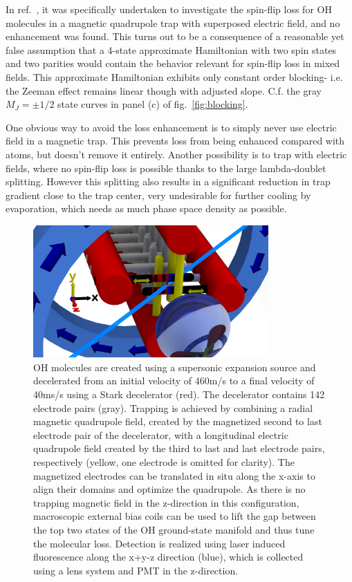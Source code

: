 \documentclass[%
 reprint,
 amsmath,amssymb,
 aps,
prl,
]{revtex4-1}
\begin{document}
In ref.~\cite{Lara2008}, it was specifically undertaken to investigate the spin-flip loss for OH molecules in a magnetic quadrupole trap with superposed electric field, and no enhancement was found. This turns out to be a consequence of a reasonable yet false assumption that a 4-state approximate Hamiltonian with two spin states and two parities would contain the behavior relevant for spin-flip loss in mixed fields. This approximate Hamiltonian exhibits only constant order blocking- i.e. the Zeeman effect remains linear though with adjusted slope. C.f. the gray $M_J=\pm1/2$ state curves in panel (c) of fig.~\ref{fig:blocking}.



One obvious way to avoid the loss enhancement is to simply never use electric field in a magnetic trap. This prevents loss from being enhanced compared with atoms, but doesn't remove it entirely. Another possibility is to trap with electric fields, where no spin-flip loss is possible thanks to the large lambda-doublet splitting. However this splitting also results in a significant reduction in trap gradient close to the trap center, very undesirable for further cooling by evaporation, which needs as much phase space density as possible.

\begin{figure}
\includegraphics[width=90mm]{blue-red-yellow-v2_CAD.png}%
\caption{
OH molecules are created using a supersonic expansion source and decelerated from an initial velocity of 460m/s to a final velocity of 40ms/s using a Stark decelerator (red). The decelerator contains 142 electrode pairs (gray). Trapping is achieved by combining a radial magnetic quadrupole field, created by the magnetized second to last electrode pair of the decelerator, with a longitudinal electric quadrupole field created by the third to last and last electrode pairs, respectively (yellow, one electrode is omitted for clarity). The magnetized electrodes can be translated in situ along the x-axis to align their domains and optimize the quadrupole. As there is no trapping magnetic field in the z-direction in this configuration, macroscopic external bias coils can be used to lift the gap between the top two states of the OH ground-state manifold and thus tune the molecular loss. Detection is realized using laser induced fluorescence along the x+y-z direction (blue), which is collected using a lens system and PMT in the z-direction.
\label{fig:CAD}}
\end{figure}
\end{document}
